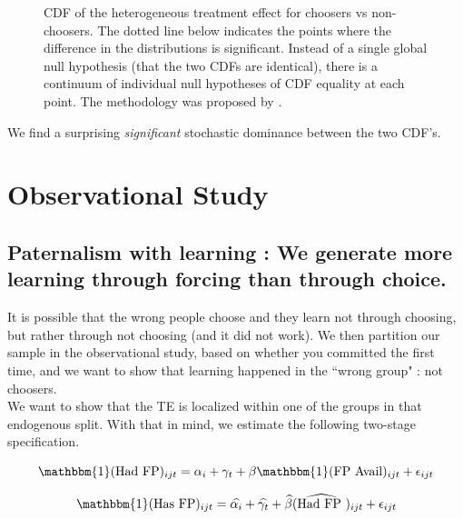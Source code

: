 \documentclass[oneside,11pt]{article}
\begin{document}
\begin{figure}[H]
\begin{center}
    \end{center}
     \scriptsize    CDF of the heterogeneous treatment effect for choosers vs non-choosers. The dotted line below indicates the points where the difference in the distributions is significant.  Instead of a single global null hypothesis (that the two CDFs are identical), there is a continuum of individual null hypotheses of CDF equality at each point. The methodology was proposed by \cite{GOLDMAN2018143}.

 

\end{figure}

We find a surprising \emph{significant} stochastic dominance between the two CDF's.



\newpage

\section{Observational Study}

\subsection*{Paternalism  with learning : We generate more learning through forcing than through choice.}

It is possible that the wrong people choose and they learn not through choosing, but rather through not choosing (and it did not work). We then partition our sample in the observational study, based on whether you committed the first time, and we want to show that learning happened in the ``wrong group" : not choosers.\\



We want to show that the TE is localized within one of the groups in that endogenous split. With that in mind, we estimate the following two-stage specification.


\begin{equation}
    \mathbbm{1}(\text{Had FP})_{ijt} = \alpha_i + \gamma_t + \beta \mathbbm{1}(\text{FP Avail})_{ijt}  + \epsilon_{ijt}
    \label{eqn:fs}
\end{equation}


\begin{equation}
    \mathbbm{1}(\text{Has FP})_{ijt} = \widehat{\alpha_i }+ \widehat{\gamma_t} + \widehat{\beta }(\widehat{\text{Had FP }})_{ijt}  + \epsilon_{ijt}
    \label{eqn:2s}
\end{equation}
\end{document}
